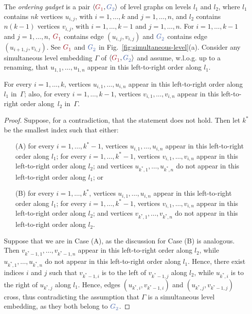 \documentclass{llncs}
\newcommand{\red}[1]{{\color{red}{#1\xspace}}}
\newcommand{\blue}[1]{{\color{blue}{#1\xspace}}}
\newcommand{\Gr}[1]{$\red{G^{#1}_1}$\xspace}
\newcommand{\Gb}[1]{$\blue{G^{#1}_2}$\xspace}
\newcommand{\sefeinstance}[1]{$\langle\red{G^{#1}_1},\blue{G^{#1}_2}\rangle$\xspace}
\begin{document}
The {\em ordering gadget} is a pair \sefeinstance{} of level graphs on levels $l_1$ and $l_2$, where $l_1$ contains $nk$ vertices $u_{i,j}$, with $i=1,\dots,k$ and $j=1,\dots,n$, and $l_2$ contains $n (k-1)$ vertices $v_{i,j}$, with $i=1,\dots,k-1$ and $j=1,\dots,n$. For $i=1,\dots,k-1$ and $j=1,\dots,n$, \Gr{} contains edge $(u_{i,j},v_{i,j})$ and \Gb{} contains edge $(u_{i+1,j},v_{i,j})$. See \Gr{} and \Gb{} in Fig.~\ref{fig:simultaneous-level}(a). Consider any simultaneous level embedding $\Gamma$ of \sefeinstance{} and assume, w.l.o.g. up to a renaming, that $u_{1,1},\dots,u_{1,n}$ appear in this left-to-right order along $l_1$.

\begin{lemma} \label{le:sl-ordering}
For every $i=1,\dots,k$, vertices $u_{i,1},\dots,u_{i,n}$ appear in this left-to-right order along $l_1$ in~$\Gamma$; also, for every $i=1,\dots,k-1$, vertices $v_{i,1},\dots,v_{i,n}$ appear in this left-to-right order along~$l_2$ in~$\Gamma$. 
\end{lemma} 

\begin{proof}
	Suppose, for a contradiction, that the statement does not hold. Then let $k^*$ be the smallest index such that either: 
	
	\begin{itemize}
		\item[(A)] for every $i=1,\dots,k^*-1$, vertices $u_{i,1},\dots,u_{i,n}$ appear in this left-to-right order along $l_1$; for every $i=1,\dots,k^*-1$, vertices $v_{i,1},\dots,v_{i,n}$ appear in this left-to-right order along $l_2$; and vertices $u_{k^*,1},\dots,u_{k^*,n}$ do not appear in this left-to-right order along $l_1$; or 
		\item[(B)] for every $i=1,\dots,k^*$, vertices $u_{i,1},\dots,u_{i,n}$ appear in this left-to-right order along $l_1$; for every $i=1,\dots,k^*-1$, vertices $v_{i,1},\dots,v_{i,n}$ appear in this left-to-right order along $l_2$; and vertices $v_{k^*,1},\dots,v_{k^*,n}$ do not appear in this left-to-right order along $l_2$.
	\end{itemize}
	
	Suppose that we are in Case (A), as the discussion for Case (B) is analogous. Then $v_{k^*-1,1},\dots,v_{k^*-1,n}$ appear in this left-to-right order along $l_2$, while $u_{k^*,1},\dots,u_{k^*,n}$ do not appear in this left-to-right order along $l_1$. Hence, there exist indices $i$ and $j$ such that $v_{k^*-1,i}$ is to the left of $v_{k^*-1,j}$ along $l_2$, while $u_{k^*,i}$ is to the right of $u_{k^*,j}$ along $l_1$. Hence, edges $(u_{k^*,i},v_{k^*-1,i})$ and  $(u_{k^*,j},v_{k^*-1,j})$ cross, thus contradicting the assumption that $\Gamma$ is a simultaneous level embedding, as they both belong to \Gb{}. 
\end{proof}
\end{document}
